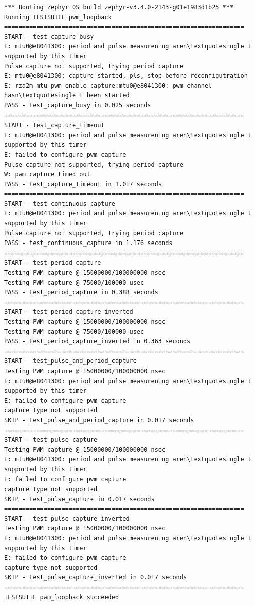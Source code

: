\documentclass[11pt,a4paper,oneside]{article}
\begin{document}
\begin{lstlisting}
*** Booting Zephyr OS build zephyr-v3.4.0-2143-g01e1983d1b25 ***
Running TESTSUITE pwm_loopback
===================================================================
START - test_capture_busy
E: mtu0@e8041300: period and pulse measurening aren\textquotesingle t
supported by this timer
Pulse capture not supported, trying period capture
E: mtu0@e8041300: capture started, pls, stop before reconfigutration
E: rza2m_mtu_pwm_enable_capture:mtu0@e8041300: pwm channel
hasn\textquotesingle t been started
PASS - test_capture_busy in 0.025 seconds
===================================================================
START - test_capture_timeout
E: mtu0@e8041300: period and pulse measurening aren\textquotesingle t
supported by this timer
E: failed to configure pwm capture
Pulse capture not supported, trying period capture
W: pwm capture timed out
PASS - test_capture_timeout in 1.017 seconds
===================================================================
START - test_continuous_capture
E: mtu0@e8041300: period and pulse measurening aren\textquotesingle t
supported by this timer
Pulse capture not supported, trying period capture
PASS - test_continuous_capture in 1.176 seconds
===================================================================
START - test_period_capture
Testing PWM capture @ 15000000/100000000 nsec
Testing PWM capture @ 75000/100000 usec
PASS - test_period_capture in 0.388 seconds
===================================================================
START - test_period_capture_inverted
Testing PWM capture @ 15000000/100000000 nsec
Testing PWM capture @ 75000/100000 usec
PASS - test_period_capture_inverted in 0.363 seconds
===================================================================
START - test_pulse_and_period_capture
Testing PWM capture @ 15000000/100000000 nsec
E: mtu0@e8041300: period and pulse measurening aren\textquotesingle t
supported by this timer
E: failed to configure pwm capture
capture type not supported
SKIP - test_pulse_and_period_capture in 0.017 seconds
===================================================================
START - test_pulse_capture
Testing PWM capture @ 15000000/100000000 nsec
E: mtu0@e8041300: period and pulse measurening aren\textquotesingle t
supported by this timer
E: failed to configure pwm capture
capture type not supported
SKIP - test_pulse_capture in 0.017 seconds
===================================================================
START - test_pulse_capture_inverted
Testing PWM capture @ 15000000/100000000 nsec
E: mtu0@e8041300: period and pulse measurening aren\textquotesingle t
supported by this timer
E: failed to configure pwm capture
capture type not supported
SKIP - test_pulse_capture_inverted in 0.017 seconds
===================================================================
TESTSUITE pwm_loopback succeeded


\end{lstlisting}
\end{document}
